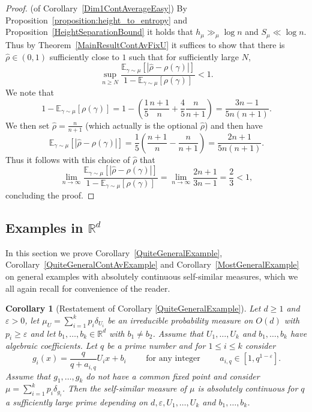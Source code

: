 \documentclass[10pt, english,oneside,reqno]{amsart}
\newtheorem*{corollary*}{Corollary}
\theoremstyle{plain}
\theoremstyle{remark}
\numberwithin{equation}{section}
\numberwithin{figure}{section}
\newcommand{\eps}{\varepsilon}
\newcommand{\R}{\mathbb{R}}
\begin{document}
\begin{proof}(of Corollary~\ref{Dim1ContAverageEasy})
    By Proposition~\ref{proposition:height_to_entropy} and Proposition~\ref{HeightSeparationBound} it holds that $h_{\mu} \gg_{\mu} \log n$ and $S_{\mu} \ll  \log n$. Thus by Theorem~\ref{MainResultContAvFixU} it suffices to show that there is $\hat{\rho} \in (0,1)$ sufficiently close to $1$ such that for sufficiently large $N$, $$\sup_{n \geq N}\frac{\mathbb{E}_{\gamma \sim \mu}[|\hat{\rho} - \rho(\gamma)|]}{1 - \mathbb{E}_{\gamma \sim \mu}[\rho(\gamma)]} < 1.$$ We note that $$1 - \mathbb{E}_{\gamma \sim \mu}[\rho(\gamma)] = 1 - \left(\frac{1}{5}\frac{n + 1}{n} + \frac{4}{5}\frac{n}{n + 1}\right) = \frac{3n - 1}{5n(n + 1)}.$$
    We then set $\hat{\rho} = \frac{n}{n + 1}$ (which actually is the optional $\hat{\rho}$) and then have $$\mathbb{E}_{\gamma \sim \mu}[|\hat{\rho} - \rho(\gamma)|] = \frac{1}{5}\left(\frac{n + 1}{n} - \frac{n}{n+1}\right) = \frac{2n + 1}{5n(n + 1)}.$$ Thus it follows with this choice of $\hat{\rho}$ that $$\lim_{n \to \infty} \frac{\mathbb{E}_{\gamma \sim \mu}[|\hat{\rho} - \rho(\gamma)|]}{1 - \mathbb{E}_{\gamma \sim \mu}[\rho(\gamma)]} = \lim_{n \to \infty} \frac{2n + 1}{3n - 1} = \frac{2}{3} < 1,$$ concluding the proof.
\end{proof}


\subsection{Examples in $\R^d$}
\label{section:GenEx}

In this section we prove Corollary~\ref{QuiteGeneralExample}, Corollary~\ref{QuiteGeneralContAvExample} and Corollary~\ref{MostGeneralExample} on general examples with absolutely continuous self-similar measures, which we all again recall for convenience of the reader.

\begin{corollary*}[Restatement of Corollary \ref{QuiteGeneralExample}]
		Let $d \geq 1$ and $\eps > 0$, let $\mu_U = \sum_{i = 1}^k p_i\delta_{U_i}$ be an irreducible probability measure on $O(d)$ with $p_i \geq \eps$ and let $b_1, \ldots , b_k \in \R^d$ with $b_1 \neq b_2$. Assume that $U_1, \ldots , U_k$ and $b_1, \ldots , b_k$ have algebraic coefficients. Let $q$ be a prime number and for $1 \leq i \leq k$ consider $$g_i(x) = \frac{q}{q+a_{i,q}}U_ix + b_i \quad \quad \text{ for any integer } \quad \quad a_{i,q} \in [1, q^{1-\eps}].$$ Assume that $g_1, \ldots , g_k$ do not have a common fixed point and consider $\mu = \sum_{i = 1}^k p_i\delta_{g_i}$. Then the self-similar measure of $\mu$ is absolutely continuous for $q$ a sufficiently large prime depending on $d,\eps,U_1, \ldots , U_k$ and $b_1, \ldots , b_k$. 
	\end{corollary*}
\end{document}
